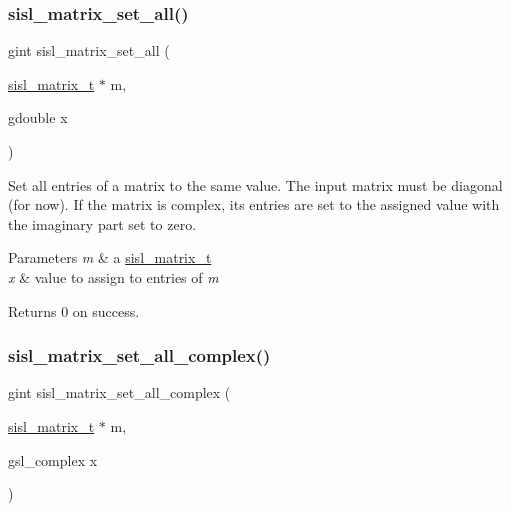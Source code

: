 \subsubsection{\texorpdfstring{sisl\+\_\+matrix\+\_\+set\+\_\+all()}{sisl\_matrix\_set\_all()}}
{\footnotesize\ttfamily gint sisl\+\_\+matrix\+\_\+set\+\_\+all (\begin{DoxyParamCaption}\item[{\mbox{\hyperlink{group__matrix_gad147923587b355644defb9bfbf981740}{sisl\+\_\+matrix\+\_\+t}} $\ast$}]{m,  }\item[{gdouble}]{x }\end{DoxyParamCaption})}

Set all entries of a matrix to the same value. The input matrix must be diagonal (for now). If the matrix is complex, its entries are set to the assigned value with the imaginary part set to zero.


\begin{DoxyParams}{Parameters}
{\em m} & a \mbox{\hyperlink{group__matrix_gad147923587b355644defb9bfbf981740}{sisl\+\_\+matrix\+\_\+t}} \\
\hline
{\em x} & value to assign to entries of {\itshape m} \\
\hline
\end{DoxyParams}
\begin{DoxyReturn}{Returns}
0 on success. 
\end{DoxyReturn}
\mbox{\label{group__matrix_ga171958e6d5574ffa91badb5ad38f8d4f}} 
\subsubsection{\texorpdfstring{sisl\+\_\+matrix\+\_\+set\+\_\+all\+\_\+complex()}{sisl\_matrix\_set\_all\_complex()}}
{\footnotesize\ttfamily gint sisl\+\_\+matrix\+\_\+set\+\_\+all\+\_\+complex (\begin{DoxyParamCaption}\item[{\mbox{\hyperlink{group__matrix_gad147923587b355644defb9bfbf981740}{sisl\+\_\+matrix\+\_\+t}} $\ast$}]{m,  }\item[{gsl\+\_\+complex}]{x }\end{DoxyParamCaption})}

